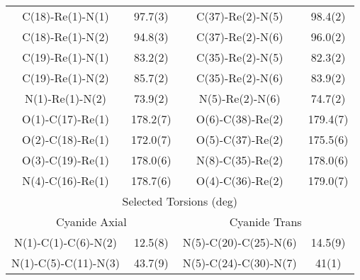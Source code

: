 \begin{table}[htbp]
\begin{tabular}{cccc}
    C(18)-Re(1)-N(1) & 97.7(3) & C(37)-Re(2)-N(5) & 98.4(2) \\
    C(18)-Re(1)-N(2) & 94.8(3) & C(37)-Re(2)-N(6) & 96.0(2) \\
    C(19)-Re(1)-N(1) & 83.2(2) & C(35)-Re(2)-N(5) & 82.3(2) \\
    C(19)-Re(1)-N(2) & 85.7(2) & C(35)-Re(2)-N(6) & 83.9(2) \\
    N(1)-Re(1)-N(2) & 73.9(2) & N(5)-Re(2)-N(6) & 74.7(2) \\
    O(1)-C(17)-Re(1) & 178.2(7) & O(6)-C(38)-Re(2) & 179.4(7) \\
    O(2)-C(18)-Re(1) & 172.0(7)& O(5)-C(37)-Re(2) & 175.5(6) \\ 
    O(3)-C(19)-Re(1) & 178.0(6) & N(8)-C(35)-Re(2) & 178.0(6) \\
    N(4)-C(16)-Re(1) & 178.7(6) & O(4)-C(36)-Re(2) & 179.0(7) \\ \midrule
    \multicolumn{4}{c}{Selected Torsions (deg)} \\ \midrule
    \multicolumn{2}{c}{Cyanide Axial} & \multicolumn{2}{c}{Cyanide Trans} \\ \midrule
    N(1)-C(1)-C(6)-N(2) & 12.5(8) & N(5)-C(20)-C(25)-N(6) & 14.5(9) \\
    N(1)-C(5)-C(11)-N(3) & 43.7(9) & N(5)-C(24)-C(30)-N(7) & 41(1) \\
    \bottomrule
    \end{tabular}%
  \label{tab.da5}%
\end{table}%


